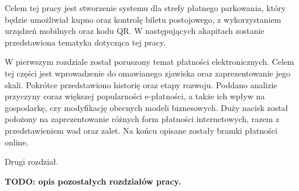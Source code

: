 Celem tej pracy jest stworzenie systemu dla strefy płatnego parkowania, który będzie umożliwiał kupno oraz kontrolę biletu postojowego, z wykorzystaniem urządzeń mobilnych oraz kodu QR. W następujących akapitach zostanie przedstawiona tematyka dotycząca tej pracy.

W pierwszym rozdziale został poruszony temat płatności elektronicznych. Celem tej części jest wprowadzenie do omawianego zjawiska oraz zaprezentowanie jego skali. Pokrótce przedstawiono historię oraz etapy rozwoju. Poddano analizie przyczyny coraz większej popularności e-płatności, a także ich wpływ na gospodarkę, czy modyfikację obecnych modeli biznesowych. Duży nacisk został położony na zaprezentowanie różnych form płatności internetowych, razem z przedstawieniem wad oraz zalet. Na końcu opisane zostały bramki płatności online.

Drugi rozdział.

\textbf{TODO: opis pozostałych rozdziałów pracy.}

